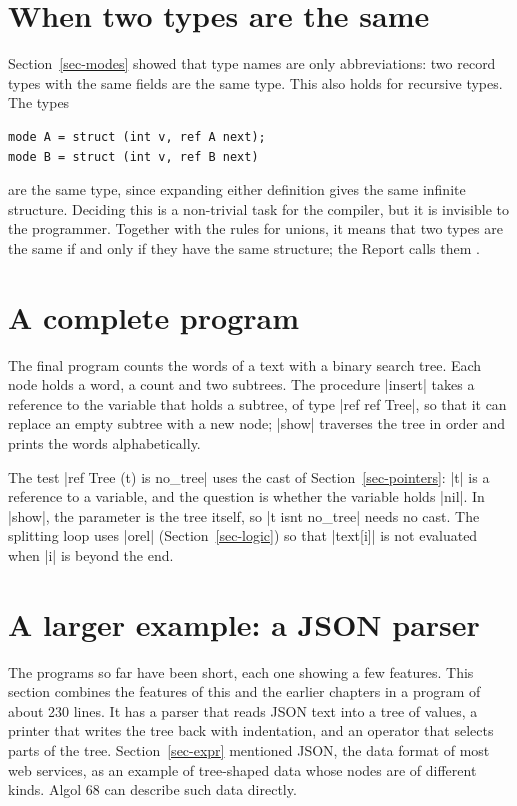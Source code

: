 \section{When two types are the same}\label{sec-equivalence}

Section~\ref{sec-modes} showed that type names are only abbreviations:
two record types with the same fields are the same type. This also holds
for recursive types. The types
\begin{lstlisting}
mode A = struct (int v, ref A next);
mode B = struct (int v, ref B next)
\end{lstlisting}
are the same type, since expanding either definition gives the same
infinite structure. Deciding this is a non-trivial task for the compiler,
but it is invisible to the programmer. Together with the rules for unions,
it means that two types are the same if and only if they have the same
structure; the Report calls them .

\section{A complete program}\label{sec-advanced-complete}

The final program counts the words of a text with a binary search tree.
Each node holds a word, a count and two subtrees. The procedure
\code|insert| takes a reference to the variable that holds a subtree, of
type \code|ref ref Tree|, so that it can replace an empty subtree with a
new node; \code|show| traverses the tree in order and prints the words
alphabetically.


The test \code|ref Tree (t) is no_tree| uses the cast of
Section~\ref{sec-pointers}: \code|t| is a reference to a variable, and the
question is whether the variable holds \code|nil|. In \code|show|, the
parameter is the tree itself, so \code|t isnt no_tree| needs no cast.
The splitting loop uses \code|orel| (Section~\ref{sec-logic}) so that
\code|text[i]| is not evaluated when \code|i| is beyond the end.

\section{A larger example: a JSON parser}\label{sec-json}

The programs so far have been short, each one showing a few features.
This section combines the features of this and the earlier chapters in a
program of about 230 lines. It has a parser that reads JSON text into a
tree of values, a printer that writes the tree back with indentation,
and an operator that selects parts of the tree. Section~\ref{sec-expr}
mentioned JSON, the data format of most web services, as an example of
tree-shaped data whose nodes are of different kinds. Algol 68 can
describe such data directly.

